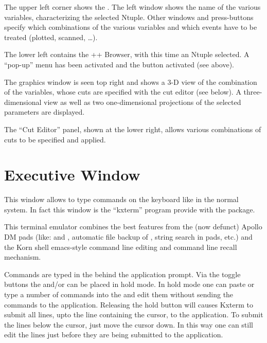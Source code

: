 
\begin{UL}
\item The upper left corner shows the \NV.
      The left window shows the name of the various variables, characterizing
      the selected Ntuple. Other windows and press-buttons specify which
      combinations of the various variables and which events
      have to be treated (plotted, scanned, \ldots).
\item The lower left contains the \PAW++{} Browser, with this time an Ntuple
      selected.
      A ``pop-up'' menu has been activated and the 
      button activated (see above).
\item The graphics window is seen top right and shows a 3-D view
      of the combination  of the variables, whose cuts are
      specified with the cut editor (see below).
      A three-dimensional view as well as two one-dimensional projections
      of the selected parameters are displayed.
\item The ``Cut Editor'' panel, shown at the lower right, allows
      various combinations of cuts to be specified and applied.
\end{UL}

\clearpage

\section{Executive Window}

This window allows to type commands on the keyboard like in the normal
\XPAW{} system. In fact this window is the ``kxterm'' program provide with
the \KUIP{} package.

This terminal emulator combines the best features from
the (now defunct) Apollo DM pads (like: \IP and \TP,
automatic file backup of \TP, string
search in pads, etc.) and the Korn shell emacs-style
command line editing and command line recall mechanism.

Commands are typed in the \IP{}  behind the application prompt.
Via the toggle buttons   the \IP{} and/or \TP{}
can be placed in hold mode. In hold mode one can paste or type
a number of commands into the \IP{} and edit them without sending
the commands to the application. Releasing the hold button
will causes Kxterm to submit all lines, upto the line containing the
cursor, to the application. To submit the lines below the cursor,
just move the cursor down. In this way one can still edit the
lines just before they are being submitted to the application.

